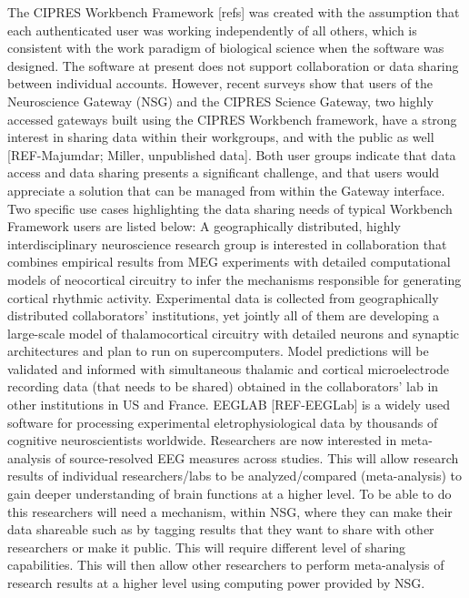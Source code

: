 \documentclass[sigconf]{acmart}
\begin{document}
The CIPRES Workbench Framework [refs] was created with the assumption that each authenticated user was working independently of all others, which is consistent with the work paradigm of biological science when the software was designed. The software at present does not support collaboration or data sharing between individual accounts. However, recent surveys show that users of the Neuroscience Gateway (NSG) and the CIPRES Science Gateway, two highly accessed gateways built using the CIPRES Workbench framework, have a strong interest in sharing data within their workgroups, and with the public as well [REF-Majumdar; Miller, unpublished data]. Both user groups indicate that data access and data sharing presents a significant challenge, and that users would appreciate a solution that can be managed from within the Gateway interface. Two specific use cases highlighting the data sharing needs of typical Workbench Framework users  are listed below:
A geographically distributed, highly interdisciplinary neuroscience research group is interested in collaboration that combines empirical results from MEG experiments with detailed computational models of neocortical circuitry to infer the mechanisms responsible for generating cortical rhythmic activity. Experimental data is collected from geographically distributed collaborators' institutions, yet jointly all of them are developing a large-scale model of thalamocortical circuitry with detailed neurons and synaptic architectures and plan to run on supercomputers. Model predictions will be validated and informed with simultaneous thalamic and cortical microelectrode recording data (that needs to be shared) obtained in the collaborators' lab in other institutions in US and France.
EEGLAB [REF-EEGLab] is a widely used software for processing experimental eletrophysiological data by thousands of cognitive neuroscientists worldwide. Researchers are now interested in meta-analysis of source-resolved EEG measures across studies. This will allow research results of individual researchers/labs to be analyzed/compared (meta-analysis) to gain deeper understanding of brain functions at a higher level. To be able to do this researchers will need a mechanism, within NSG, where they can make their data shareable such as by tagging results that they want to share with other researchers or make it public. This will require different level of sharing capabilities. This will then allow other researchers to perform meta-analysis of research results at a higher level using computing power provided by NSG.
\end{document}
